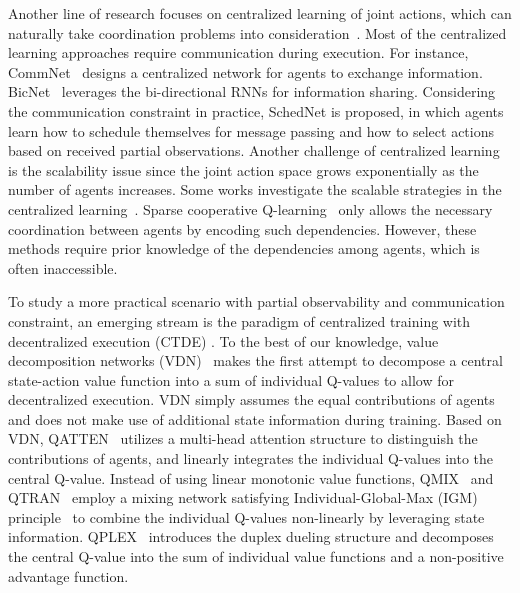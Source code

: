 \documentclass{article}
\begin{document}
Another line of research focuses on centralized learning of joint actions, which can naturally take coordination problems into consideration~\cite{sukhbaatar2016learning,peng2017multiagent}.
Most of the centralized learning approaches require communication during execution.
For instance, CommNet~\cite{sukhbaatar2016learning} designs a centralized network for agents to exchange information.
BicNet~\cite{peng2017multiagent} leverages the bi-directional RNNs for information sharing.
Considering the communication constraint in practice, SchedNet \cite{kim2019learning} is proposed, in which agents learn how to schedule themselves for message passing and how to select actions based on received partial observations.
Another challenge of centralized learning is the scalability issue since the joint action space grows exponentially as the number of agents increases.
Some works investigate the scalable strategies in the centralized learning~\cite{guestrin2001multiagent,kok2006collaborative}.
Sparse cooperative Q-learning~\cite{kok2006collaborative} only allows the necessary coordination between agents by encoding such dependencies.
However, these methods require prior knowledge of the dependencies among agents, which is often inaccessible.

To study a more practical scenario with partial observability and communication constraint, an emerging stream is the paradigm of centralized training with decentralized execution (CTDE) \cite{oliehoek2008optimal,kraemer2016multi}.
To the best of our knowledge, value decomposition networks (VDN)~\cite{sunehag2017value} makes the first attempt to decompose a central state-action value function into a sum of individual Q-values to allow for decentralized execution.
VDN simply assumes the equal contributions of agents and does not make use of additional state information during training.
Based on VDN, QATTEN~\cite{yang2020qatten} utilizes a multi-head attention structure to distinguish the contributions of agents, and linearly integrates the individual Q-values into the central Q-value.
Instead of using linear monotonic value functions, QMIX~\cite{rashid2018qmix} and QTRAN~\cite{son2019qtran} employ a mixing network satisfying Individual-Global-Max (IGM) principle~\cite{son2019qtran} to combine the individual Q-values non-linearly by leveraging state information.
QPLEX~\cite{wang2020qplex} introduces the duplex dueling structure and decomposes the central Q-value into the sum of individual value functions and a non-positive advantage function.
\end{document}
